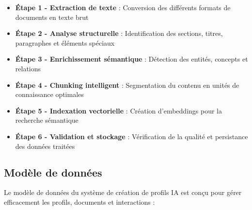 \begin{itemize}
  \item \textbf{Étape 1 - Extraction de texte} : Conversion des différents formats de documents en texte brut
  
  \item \textbf{Étape 2 - Analyse structurelle} : Identification des sections, titres, paragraphes et éléments spéciaux
  
  \item \textbf{Étape 3 - Enrichissement sémantique} : Détection des entités, concepts et relations
  
  \item \textbf{Étape 4 - Chunking intelligent} : Segmentation du contenu en unités de connaissance optimales
  
  \item \textbf{Étape 5 - Indexation vectorielle} : Création d'embeddings pour la recherche sémantique
  
  \item \textbf{Étape 6 - Validation et stockage} : Vérification de la qualité et persistance des données traitées
\end{itemize}

\subsection{Modèle de données}

Le modèle de données du système de création de profils IA est conçu pour gérer efficacement les profils, documents et interactions :

